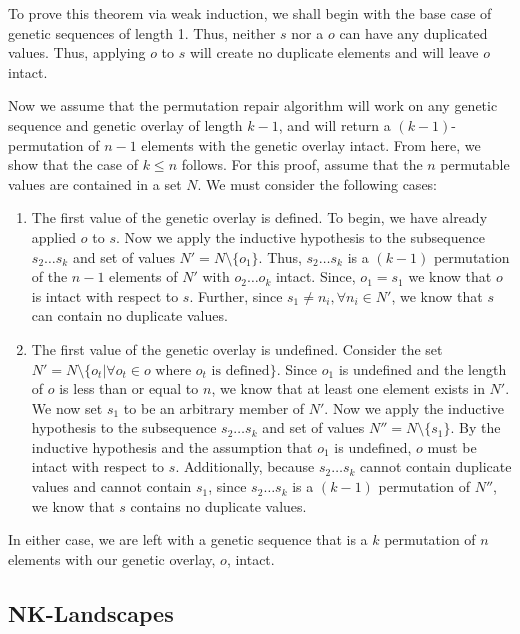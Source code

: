 To prove this theorem via weak induction, we shall begin with the base case of genetic sequences of length 1. Thus, neither $s$ nor a $o$ can have any duplicated values. Thus, applying $o$ to $s$ will create no duplicate elements and will leave $o$ intact. 

Now we assume that the permutation repair algorithm will work on any genetic sequence and genetic overlay of length $k - 1$, and will return a $(k - 1)$-permutation of $n-1$ elements with the genetic overlay intact. From here, we show that the case of $k \leq n$ follows. For this proof, assume that the $n$ permutable values are contained in a set $N$. We must consider the following cases:
\begin{enumerate}
\item The first value of the genetic overlay is defined. 
To begin, we have already applied $o$ to $s$. Now we apply the inductive hypothesis to the subsequence $s_2 \ldots s_k$ and set of values $ N' = N \setminus \{ o_1 \}$. Thus, $s_2 \ldots s_k$ is a $(k-1)$ permutation of the $n-1$ elements of $N'$ with $o_2 \ldots o_k$ intact. Since,  $o_1 = s_1$ we know that $o$ is intact with respect to $s$. Further, since $s_1 \neq n_i, \forall n_i \in N'$, we know that $s$ can contain no duplicate values.

\item The first value of the genetic overlay is undefined. 
Consider the set $N' = N \setminus \{ o_t | \forall o_t \in o \text{ where } o_t \text{ is defined} \}$. Since $o_1$ is undefined and the length of $o$ is less than or equal to $n$, we know that at least one element exists in $N'$. We now set $s_1$ to be an arbitrary member of $N'$.  Now we apply the inductive hypothesis to the subsequence $s_2 \ldots s_k$ and set of values $ N'' = N \setminus \{ s_1 \}$. By the inductive hypothesis and the assumption that $o_1$ is undefined, $o$ must be intact with respect to $s$. Additionally, because $s_2 \ldots s_k$ cannot contain duplicate values and cannot contain $s_1$, since $s_2 \ldots s_k$ is a $(k-1)$ permutation of $N''$, we know that $s$ contains no duplicate values.

\end{enumerate}

In either case, we are left with a genetic sequence that is a $k$ permutation of $n$ elements with our genetic overlay, $o$, intact. \blacksquare 

%
%

\subsection*{NK-Landscapes}

